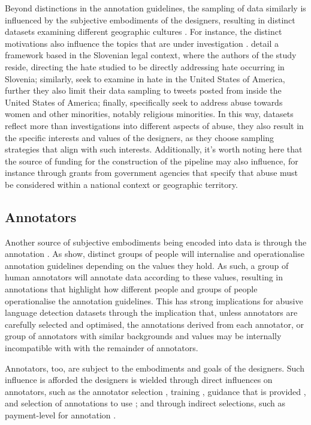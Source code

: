 Beyond distinctions in the annotation guidelines, the sampling of data similarly is influenced by the subjective embodiments of the designers, resulting in distinct datasets examining different geographic cultures \citep{Waseem:2018}. For instance, the distinct motivations also influence the topics that are under investigation \citep{Waseem:2018}. \citet{Fiser:2017} detail a framework based in the Slovenian legal context, where the authors of the study reside, directing the hate studied to be directly addressing hate occurring in Slovenia; similarly, \citet{Davidson:2017} seek to examine in hate in the United States of America, further they also limit their data sampling to tweets posted from inside the United States of America; finally, \citet{Waseem-Hovy:2016} specifically seek to address abuse towards women and other minorities, notably religious minorities.
In this way, datasets reflect more than investigations into different aspects of abuse, they also result in the specific interests and values of the designers, as they choose sampling strategies that align with such interests. Additionally, it's worth noting here that the source of funding for the construction of the pipeline may also influence, for instance through grants from government agencies that specify that abuse must be considered within a national context or geographic territory.

\subsection{Annotators}

Another source of subjective embodiments being encoded into data is through the annotation \citep{Waseem:2016}. As \citet{Waseem:2016} show, distinct groups of people will internalise and operationalise annotation guidelines depending on the values they hold. As such, a group of human annotators will annotate data according to these values, resulting in annotations that highlight how different people and groups of people operationalise the annotation guidelines. This has strong implications for abusive language detection datasets through the implication that, unless annotators are carefully selected and optimised, the annotations derived from each annotator, or group of annotators with similar backgrounds and values  may be internally incompatible with with the remainder of annotators.

Annotators, too, are subject to the embodiments and goals of the designers. Such influence is afforded the designers is wielded through direct influences on annotators, such as the annotator selection \citep{Waseem:2016}, training \citep{Vidgen:2020}, guidance that is provided \citep{Palmer:2020}, and selection of annotations to use \citep{Hovy:2013}; and through indirect selections, such as payment-level for annotation \citep{Sabou:2014}.

